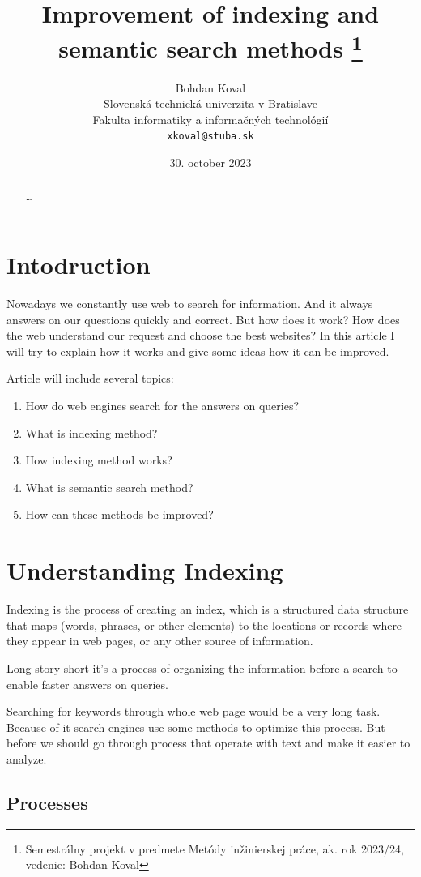 \documentclass[10pt,a4paper]{article}
\title{Improvement of indexing and semantic search methods \thanks{Semestrálny projekt v predmete Metódy inžinierskej práce, ak. rok 2023/24, vedenie: Bohdan Koval}} %
\author{Bohdan Koval\\[2pt]
	{\small Slovenská technická univerzita v Bratislave}\\
	{\small Fakulta informatiky a informačných technológií}\\
	{\small \texttt{xkoval@stuba.sk}}
	}
\date{\small 30. october 2023} %
\begin{document}
\maketitle

\begin{abstract}
\ldots
\end{abstract}



\section{Intodruction}

Nowadays we constantly use web to search for information. And it always answers on our questions quickly and correct. But how does it work? How does the web understand our request and choose the best websites? In this article I will try to explain how it works and give some ideas how it can be improved.

Article will include several topics:
\begin{enumerate}
  \item How do web engines search for the answers on queries?
  \item What is indexing method?
  \item How indexing method works?
  \item What is semantic search method?
  \item How can these methods be improved?
\end{enumerate}



\section{Understanding Indexing} \label{nejaka}
 Indexing is the process of creating an index, which is a structured data structure that maps (words, phrases, or other elements) to the locations or records where they appear in web pages, or any other source of information.

 Long story short it's a process of organizing the information before a search to enable faster answers on queries.
 
Searching for keywords through whole web page would be a very long task. Because of it search engines use some methods to optimize this process. But before we should go through process that operate with text and make it easier to analyze.



\subsection{Processes}
\end{document}
